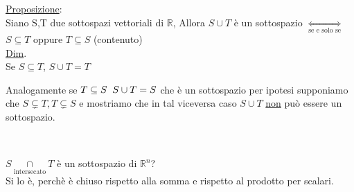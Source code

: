 \textsf{\underline{Proposizione}:}\\
\textsf{\small Siano S,T due sottospazi vettoriali di $\mathbb{R}$, Allora $S \cup T$ è un sottospazio $\underset{\text{se e solo se}}{\Leftrightarrow}$ $S \subseteq T $ oppure $T \subseteq S$ (contenuto)}\\ \vspace{.2cm}
\textsf{\underline{Dim}.}\\
\textsf{\small Se $S \subseteq T$, $S \cup T = T$}\\
\noindent\begin{minipage}{.5\linewidth}
\end{minipage}
\begin{minipage}{.45\linewidth}
\textsf{\small Analogamente se $T \subseteq S \hspace{.2cm} S \cup T = S $ che è un sottospazio per ipotesi supponiamo che $S \subsetneq T , T \subsetneq S $ e mostriamo che in tal viceversa caso $S \cup T$ \underline{non} può essere un sottospazio.}
\end{minipage}\\
\vspace{.5cm}
\noindent\begin{minipage}{.5\linewidth}
\end{minipage}
\begin{minipage}{.45\linewidth}
\textsf{\small $S \underset{\text{intersecato}}{\cap} T$ è un sottospazio di $\mathbb{R}^n$?}\\
\textsf{\small Si lo è, perchè è chiuso rispetto alla somma e rispetto al prodotto per scalari.}
\end{minipage}\\ \vspace{.2cm}
